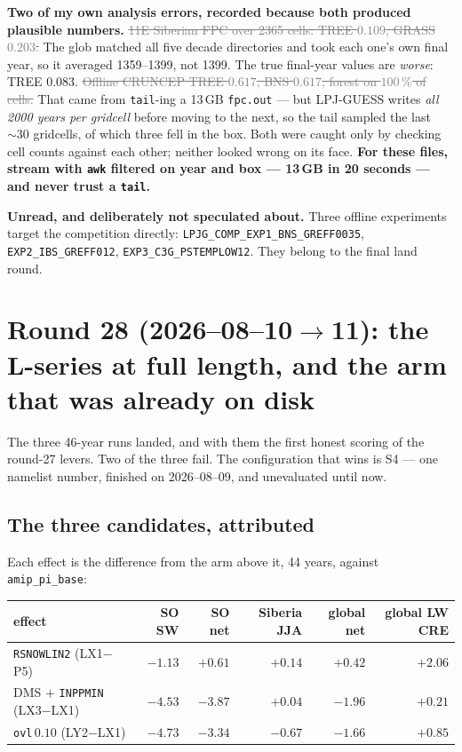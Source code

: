 \documentclass[10pt]{article}
\newcommand{\dead}[1]{\textcolor{gray}{\sout{#1}}}
\begin{document}
\textbf{Two of my own analysis errors, recorded because both produced plausible numbers.}
\dead{11E Siberian FPC over 2365 cells: TREE $0.109$, GRASS $0.203$.} The glob matched all
five decade directories and took each one's own final year, so it averaged 1359--1399, not
1399. The true final-year values are \emph{worse}: TREE $0.083$.
\dead{Offline CRUNCEP TREE $0.617$, BNS $0.617$, forest on $100\,\%$ of cells.} That came
from \texttt{tail}-ing a 13\,GB \texttt{fpc.out} --- but LPJ-GUESS writes \emph{all 2000
years per gridcell} before moving to the next, so the tail sampled the last ${\sim}30$
gridcells, of which three fell in the box. Both were caught only by checking cell counts
against each other; neither looked wrong on its face. \textbf{For these files, stream with
\texttt{awk} filtered on year and box --- 13\,GB in 20 seconds --- and never trust a
\texttt{tail}.}

\textbf{Unread, and deliberately not speculated about.} Three offline experiments target
the competition directly: \texttt{LPJG\_COMP\_EXP1\_BNS\_GREFF0035},
\texttt{EXP2\_IBS\_GREFF012}, \texttt{EXP3\_C3G\_PSTEMPLOW12}. They belong to the final
land round.

\section{Round 28 (2026--08--10$\to$11): the L-series at full length, and the arm that was
already on disk}\label{sec:r28}
The three 46-year runs landed, and with them the first honest scoring of the round-27
levers. Two of the three fail. The configuration that wins is S4 --- one namelist number,
finished on 2026--08--09, and unevaluated until now.

\subsection{The three candidates, attributed}\label{sub:r28attrib}
Each effect is the difference from the arm above it, 44 years, against \texttt{amip\_pi\_base}:

\begin{center}\footnotesize
\begin{tabular}{l r r r r r}
\toprule
effect & SO SW & \textbf{SO net} & Siberia JJA & global net & global LW CRE \\
\midrule
\texttt{RSNOWLIN2} (LX1$-$P5) & $-1.13$ & $\mathbf{+0.61}$ & $+0.14$ & $\mathbf{+0.42}$ & $\mathbf{+2.06}$ \\
DMS $+$ \texttt{INPPMIN} (LX3$-$LX1) & $-4.53$ & $-3.87$ & $+0.04$ & $-1.96$ & $+0.21$ \\
\texttt{ovl}$\,0.10$ (LY2$-$LX1) & $-4.73$ & $-3.34$ & $\mathbf{-0.67}$ & $-1.66$ & $+0.85$ \\
\bottomrule
\end{tabular}
\end{center}
\end{document}
